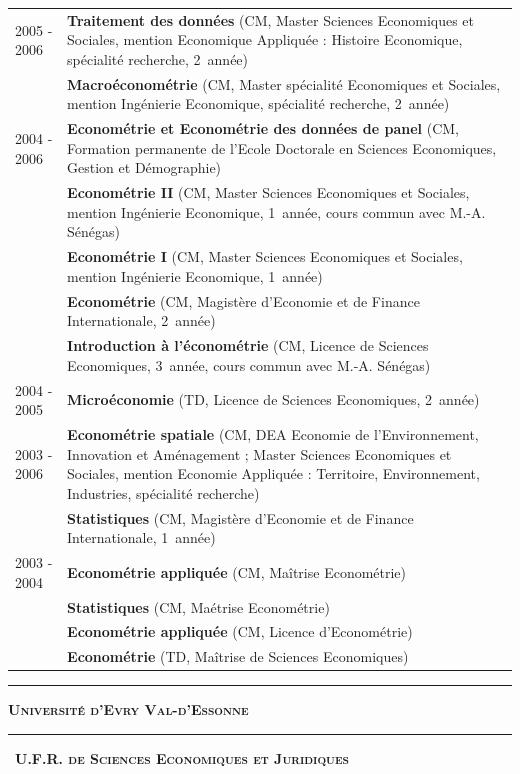 \documentclass[a4paper,12pt]{article}
\newcommand{\titre}[1]{%
	\bigskip
	\noindent \rule[2mm]{\textwidth}{0.5pt}
	\textbf{\textsc{\large #1}} \\
	\noindent \rule[1mm]{\textwidth}{0.5pt}
	}
\newcommand{\smalltitre}[1]{%
	\noindent \textbullet~\textsc{\textbf{#1}}
	\smallskip
	}
\begin{document}
\noindent \begin{longtable}{@{}p{\annee}p{\texte}@{}}
2005 - 2006	& \textbf{Traitement des données} (CM, Master Sciences Economiques et Sociales, mention Economique Appliquée : Histoire Economique, spécialité recherche, 2\ieme{}~année) \\
			& \textbf{Macroéconométrie} (CM, Master spécialité Economiques et Sociales, mention Ingénierie Economique, spécialité recherche, 2\ieme{}~année) \\
2004 - 2006	& \textbf{Econométrie et Econométrie des données de panel} (CM, Formation permanente de l'Ecole Doctorale en Sciences Economiques, Gestion et Démographie) \\
			& \textbf{Econométrie II} (CM, Master Sciences Economiques et Sociales, mention Ingénierie Economique, 1\iere{}~année, cours commun avec M.-A. Sénégas) \\
			& \textbf{Econométrie I} (CM, Master Sciences Economiques et Sociales, mention Ingénierie Economique, 1\iere{}~année) \\
			& \textbf{Econométrie} (CM, Magistère d'Economie et de Finance Internationale, 2\ieme{}~année) \\
			& \textbf{Introduction à l'économétrie} (CM, Licence de Sciences Economiques, 3\ieme{}~année, cours commun avec M.-A. Sénégas) \\
2004 - 2005	& \textbf{Microéconomie} (TD, Licence de Sciences Economiques, 2\ieme{}~année) \\
2003 - 2006	& \textbf{Econométrie spatiale} (CM, DEA Economie de l'Environnement, Innovation et Aménagement ; Master Sciences Economiques et Sociales, mention Economie Appliquée : Territoire, Environnement, Industries, spécialité recherche) \\
			& \textbf{Statistiques} (CM, Magistère d'Economie et de Finance Internationale, 1\iere{}~année) \\
2003 - 2004	& \textbf{Econométrie appliquée} (CM, Maîtrise Econométrie) \\
			& \textbf{Statistiques} (CM, Maétrise Econométrie) \\
			& \textbf{Econométrie appliquée} (CM, Licence d'Econométrie) \\
			& \textbf{Econométrie} (TD, Maîtrise de Sciences Economiques)
\end{longtable}


\titre{Université d'Evry Val-d'Essonne}

\smalltitre{U.F.R. de Sciences Economiques et Juridiques}
\end{document}
